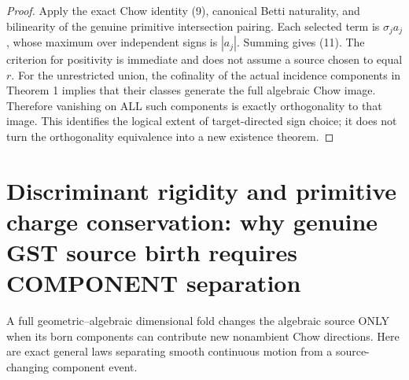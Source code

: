 \documentclass[11pt]{article}
\begin{document}
\begin{proof}
Apply the exact Chow identity (9),
canonical Betti naturality,
and bilinearity of the genuine
primitive intersection pairing.
Each selected term is
$\sigma_j a_j$, whose maximum
over independent signs is
$|a_j|$. Summing gives (11).
The criterion for positivity is
immediate and does not assume a
source chosen to equal $r$.
For the unrestricted union,
the cofinality of the actual
incidence components in
Theorem 1 implies that their
classes generate the full
algebraic Chow image. Therefore
vanishing on ALL such components
is exactly orthogonality to that
image. This identifies the
logical extent of target-directed
sign choice; it does not turn
the orthogonality equivalence
into a new existence theorem.
\end{proof}



\section{Discriminant rigidity and primitive charge conservation:
why genuine GST source birth requires COMPONENT separation}

A full geometric--algebraic dimensional fold changes the algebraic
source ONLY when its born components can contribute
new nonambient Chow directions.
Here are exact general laws separating smooth continuous
motion from a source-changing component event.
\end{document}
